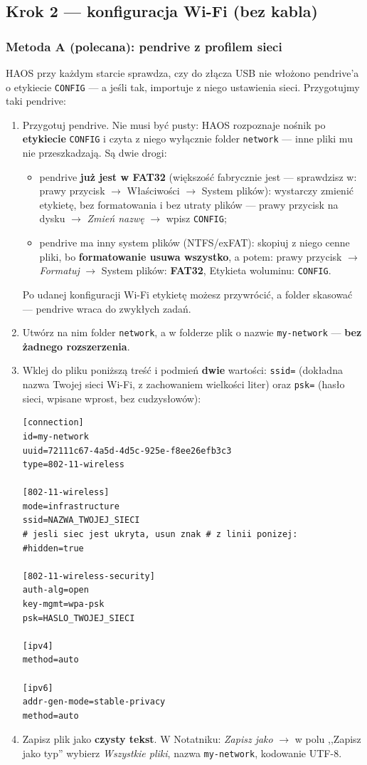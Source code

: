\documentclass[11pt,a4paper]{article}
\begin{document}
\subsection{Krok 2 --- konfiguracja Wi-Fi (bez kabla)}
\label{sec:rpi-wifi}

\subsubsection{Metoda A (polecana): pendrive z profilem sieci}

HAOS przy każdym starcie sprawdza, czy do złącza USB nie włożono pendrive'a o etykiecie \texttt{CONFIG} --- a jeśli tak, importuje z niego ustawienia sieci. Przygotujmy taki pendrive:

\begin{enumerate}
\item Przygotuj pendrive. Nie musi być pusty: HAOS rozpoznaje nośnik po \textbf{etykiecie} \texttt{CONFIG} i czyta z niego wyłącznie folder \texttt{network} --- inne pliki mu nie przeszkadzają. Są dwie drogi:
  \begin{itemize}
  \item pendrive \textbf{już jest w FAT32} (większość fabrycznie jest --- sprawdzisz w: prawy przycisk $\to$ Właściwości $\to$ System plików): wystarczy zmienić etykietę, bez formatowania i bez utraty plików --- prawy przycisk na dysku $\to$ \emph{Zmień nazwę} $\to$ wpisz \texttt{CONFIG};
  \item pendrive ma inny system plików (NTFS/exFAT): skopiuj z niego cenne pliki, bo \textbf{formatowanie usuwa wszystko}, a potem: prawy przycisk $\to$ \emph{Formatuj} $\to$ System plików: \textbf{FAT32}, Etykieta woluminu: \texttt{CONFIG}.
  \end{itemize}
  Po udanej konfiguracji Wi-Fi etykietę możesz przywrócić, a folder skasować --- pendrive wraca do zwykłych zadań.
\item Utwórz na nim folder \texttt{network}, a w folderze plik o nazwie \texttt{my-network} --- \textbf{bez żadnego rozszerzenia}.
\item Wklej do pliku poniższą treść i podmień \textbf{dwie} wartości: \texttt{ssid=} (dokładna nazwa Twojej sieci Wi-Fi, z zachowaniem wielkości liter) oraz \texttt{psk=} (hasło sieci, wpisane wprost, bez cudzysłowów):
\begin{lstlisting}
[connection]
id=my-network
uuid=72111c67-4a5d-4d5c-925e-f8ee26efb3c3
type=802-11-wireless

[802-11-wireless]
mode=infrastructure
ssid=NAZWA_TWOJEJ_SIECI
# jesli siec jest ukryta, usun znak # z linii ponizej:
#hidden=true

[802-11-wireless-security]
auth-alg=open
key-mgmt=wpa-psk
psk=HASLO_TWOJEJ_SIECI

[ipv4]
method=auto

[ipv6]
addr-gen-mode=stable-privacy
method=auto
\end{lstlisting}
\item Zapisz plik jako \textbf{czysty tekst}. W Notatniku: \emph{Zapisz jako} $\to$ w polu ,,Zapisz jako typ'' wybierz \emph{Wszystkie pliki}, nazwa \texttt{my-network}, kodowanie UTF-8.
\end{enumerate}
\end{document}
